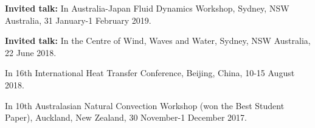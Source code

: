 \documentclass[letterpaper, 10pt]{article}
\newenvironment{changemargin}[2]{%
  \begin{list}{}{%
      \setlength{\topsep}{0pt}%
      \setlength{\leftmargin}{#1}%
      \setlength{\rightmargin}{#2}%
      \setlength{\listparindent}{\parindent}%
      \setlength{\itemindent}{\parindent}%
      \setlength{\parsep}{\parskip}%
    }%
  \item[]}{\end{list}
}
\newenvironment{body} {
  \vspace*{-16pt}
  \begin{changemargin}{-0.25in}{-0.5in}
  }
  {\end{changemargin}
}
\begin{document}
\begin{body}
  \smallskip
  
  {\bf Invited talk: } %
  In Australia-Japan Fluid Dynamics Workshop, Sydney, NSW Australia, 31 January-1 February 2019.
  
  \smallskip
  
  {\bf Invited talk: } %
  In the Centre of Wind, Waves and Water, Sydney, NSW Australia, 22 June 2018.
  
  \smallskip
  
  In 16th International Heat Transfer Conference, Beijing, China, 10-15 August 2018. 
  
  \smallskip
  
  In 10th Australasian Natural Convection Workshop (won the Best Student Paper), Auckland, New Zealand, 30 November-1 December 2017. 

\end{body}
\smallskip
\end{document}
